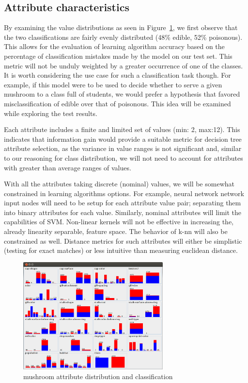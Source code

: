 \documentclass{sig-alternate}
\begin{document}
\subsection{Attribute characteristics}

By examining the value distributions as seen in Figure~\ref{ag-data-viz}, we first observe that the two classifications are fairly evenly distributed (48\% edible, 52\% poisonous). This allows for the evaluation of learning algorithm accuracy based on the percentage of classification mistakes made by the model on our test set. This metric will not be unduly weighted by a greater occurrence of one of the classes. It is worth considering the use case for such a classification task though. For example, if this model were to be used to decide whether to serve a given mushroom to a class full of students, we would prefer a hypothesis that favored misclassification of edible over that of poisonous. This idea will be examined while exploring the test results.

Each attribute includes a finite and limited set of values (min: 2, max:12). This indicates that information gain would provide a suitable metric for decision tree attribute selection, as the variance in value ranges is not significant and, similar to our reasoning for class distribution, we will not need to account for attributes with greater than average ranges of values.

With all the attributes taking discrete (nominal) values, we will be somewhat constrained in learning algorithms options. For example, neural network network input nodes will need to be setup for each attribute value pair; separating them into binary attributes for each value. Similarly, nominal attributes will limit the capabilities of SVM. Non-linear kernels will not be effective in increasing the, already linearity separable, feature space. The behavior of k-nn will also be constrained as well. Distance metrics for such attributes will either be simplistic (testing for exact matches) or less intuitive than measuring euclidean distance.

\begin{figure}
    \centering
    \includegraphics[width=3in]{data/agaricus-lepiota/ag-data-viz.png}
    \caption{mushroom attribute distribution and classification \label{ag-data-viz}}
\end{figure} 
\end{document}
